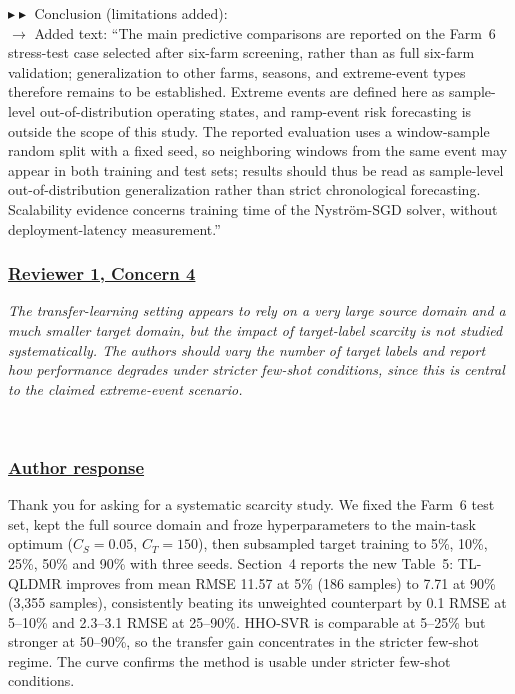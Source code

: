 \documentclass[journal,12pn, onecolumn]{IEEEtran}
\begin{document}
{{{{{{{{{$\blacktriangleright\blacktriangleright$ Conclusion (limitations added):\\
$\longrightarrow$ Added text: ``{\color{blue}The main predictive comparisons are reported on the Farm~6 stress-test case selected after six-farm screening, rather than as full six-farm validation; generalization to other farms, seasons, and extreme-event types therefore remains to be established.} {\color{blue}Extreme events are defined here as sample-level out-of-distribution operating states, and ramp-event risk forecasting is outside the scope of this study.} {\color{blue}The reported evaluation uses a window-sample random split with a fixed seed, so neighboring windows from the same event may appear in both training and test sets; results should thus be read as sample-level out-of-distribution generalization rather than strict chronological forecasting.} {\color{blue}Scalability evidence concerns training time of the Nystr\"{o}m-SGD solver, without deployment-latency measurement.}''

\textcolor{customgreen}{
\subsubsection*{\underline{\textbf{Reviewer 1, Concern 4}}}
\emph{The transfer-learning setting appears to rely on a very large source domain and a much smaller target domain, but the impact of target-label scarcity is not studied systematically. The authors should vary the number of target labels and report how performance degrades under stricter few-shot conditions, since this is central to the claimed extreme-event scenario.}
}\\

{\color{black}
\subsubsection*{\textbf{\underline{Author response}}}
Thank you for asking for a systematic scarcity study. We fixed the Farm~6 test set, kept the full source domain and froze hyperparameters to the main-task optimum ($C_S=0.05$, $C_T=150$), then subsampled target training to 5\%, 10\%, 25\%, 50\% and 90\% with three seeds. Section~4 reports the new Table~5: TL-QLDMR improves from mean RMSE 11.57 at 5\% (186 samples) to 7.71 at 90\% (3{,}355 samples), consistently beating its unweighted counterpart by 0.1 RMSE at 5--10\% and 2.3--3.1 RMSE at 25--90\%. HHO-SVR is comparable at 5--25\% but stronger at 50--90\%, so the transfer gain concentrates in the stricter few-shot regime. The curve confirms the method is usable under stricter few-shot conditions.

}}}}}}}}}}
\end{document}
